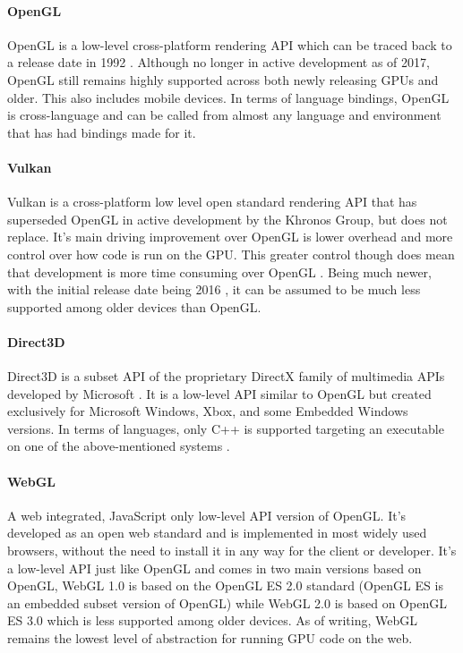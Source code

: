 \paragraph{OpenGL}
OpenGL is a low-level cross-platform rendering API which can be traced back to a release date in 1992 \cite[]{wiki:opengl}. Although no longer in active development as of 2017, OpenGL still remains highly supported across both newly releasing GPUs and older. This also includes mobile devices. In terms of language bindings, OpenGL is cross-language and can be called from almost any language and environment that has had bindings made for it. \cite[]{segal_2022_the}

\paragraph{Vulkan}
Vulkan is a cross-platform low level open standard rendering API that has superseded OpenGL in active development by the Khronos Group, but does not replace. It’s main driving improvement over OpenGL is lower overhead and more control over how code is run on the GPU. This greater control though does mean that development is more time consuming over OpenGL \cite[]{Vulkan}. Being much newer, with the initial release date being 2016 \cite[]{khronosgroup_2016_khronos}, it can be assumed to be much less supported among older devices than OpenGL.

\paragraph{Direct3D}
Direct3D is a subset API of the proprietary DirectX family of multimedia APIs developed by Microsoft \cite[]{grantmestrength_2021_direct3d}. It is a low-level API similar to OpenGL but created exclusively for Microsoft Windows, Xbox, and some Embedded Windows versions. In terms of languages, only C++ is supported targeting an executable on one of the above-mentioned systems \cite[]{stevewhims_2021_direct3d}.

\paragraph{WebGL}
A web integrated, JavaScript only low-level API version of OpenGL. It’s developed as an open web standard and is implemented in most widely used browsers, without the need to install it in any way for the client or developer. It’s a low-level API just like OpenGL and comes in two main versions based on OpenGL, WebGL 1.0 is based on the OpenGL ES 2.0 standard (OpenGL ES is an embedded subset version of OpenGL) while WebGL 2.0 is based on OpenGL ES 3.0 which is less supported among older devices. As of writing, WebGL remains the lowest level of abstraction for running GPU code on the web. \cite[]{mozilla_2019_webgl} \cite[]{khronosgroup_2011_webgl}

